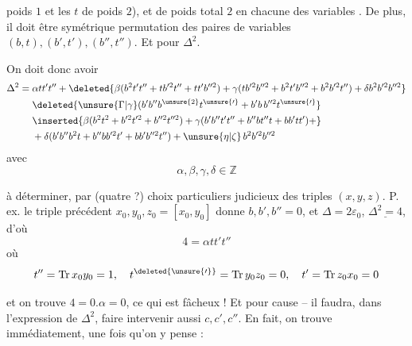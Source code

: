 poids $1$ et les $t$ de poids $2$), et de poids total $2$ en chacune des  variables  . De plus, il doit être symétrique  permutation des   paires de variables $(b,t),(b',t'),(b'',t'')$. Et  pour $\Delta^2$.

On doit donc avoir
\[
\begin{aligned}
\Delta^2={}&\alpha tt't''+
\deleted{\beta(b^2t't''+t b^{\prime 2}t''+tt'b^{\prime\prime 2})+\gamma(t b^{\prime 2}b^{\prime\prime 2}+b^2t'b^{\prime\prime 2}+b^2b^{\prime 2}t'')+\delta b^2b^{\prime 2}b^{\prime\prime 2}}\\
&\deleted{\unsure{\Gamma|\gamma}(b'b''b^{\unsure{2}}t^{\unsure{\prime}}+b'b\,b^{\prime\prime 2}t^{\unsure{\prime}}}\\
&\inserted{\beta(b^2t^2+b^{\prime 2}t^{\prime 2}+b^{\prime\prime 2}t^{\prime\prime 2})+\gamma(b'b''t't''+b''bt''t+bb'tt')+}\\
&+\delta(b'b''b^2t+b''bb^{\prime 2}t'+bb'b^{\prime\prime 2}t'')+\unsure{\eta|\zeta}\, b^2b^{\prime 2}b^{\prime\prime 2}
\end{aligned}
\]
avec
\[
 \alpha,\beta,\gamma,\delta\in\mathbb Z
\]

à déterminer, par (quatre ?) choix particuliers judicieux des triples $(x,y,z)$. P. ex. le triple précédent $x_0,y_0,z_0=[x_0,y_0]$ donne $b,b',b''=0$, et $\Delta=2\varepsilon_0$, $\underline{\Delta^2=4}$, d'où
\[
 4=\alpha tt't''
\]
où
\[
 t''=\operatorname{Tr}x_0y_0=1,\quad t^{\deleted{\unsure{\prime}}}=\operatorname{Tr}y_0z_0=0,\quad t'=\operatorname{Tr}z_0x_0=0
\]

et on trouve $4=0.\alpha=0$, ce qui est fâcheux ! Et pour cause -- il faudra, dans l'expression de $\Delta^2$, faire intervenir aussi $c,c',c''$. En fait, on trouve immédiatement, une fois qu'on y pense :
